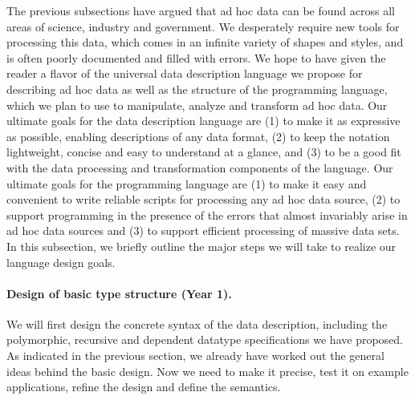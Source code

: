 \documentclass[11pt]{article}
\begin{document}
The previous subsections have argued
that ad hoc data can be found across all areas of science,
industry and government.  We desperately require new tools for processing
this data, which comes in an infinite variety of shapes and styles,
and is often poorly documented and filled with errors.  We hope to
have given the reader a flavor of the
universal data description language we propose for describing
ad hoc data as well as the structure of
the \datatype{} programming language, which we plan to use to
manipulate, analyze and transform ad hoc data.
Our ultimate goals for the data description language are (1) to make it
as expressive as possible, enabling descriptions of
any data format, (2) to keep the notation lightweight, 
concise and easy to understand at a glance, and (3)
to be a good fit with the data processing and
transformation components of the \datatype{} language.
Our ultimate goals for the \datatype{} programming language
are (1) to make it easy and convenient to write reliable
scripts for processing any ad hoc data source, (2)
to support programming in the presence of the errors that
almost invariably arise in ad hoc data sources and (3)
to support efficient processing of massive data sets.
In this subsection, we briefly outline the major steps
we will take to realize our language design goals.

\paragraph*{Design of basic type structure (Year 1).}
We will first design the concrete syntax of the data description,
including the polymorphic, recursive and dependent datatype specifications 
we have proposed.
As indicated in the previous section, we already have worked
out the general ideas behind the basic design.  Now we need to make 
it precise, test it on example applications, refine the design
and define the semantics.  

\end{document}
